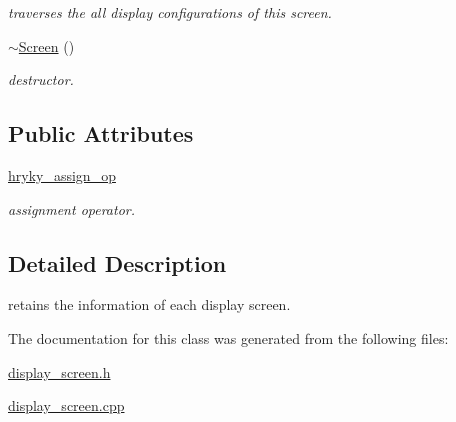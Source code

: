 \begin{DoxyCompactItemize}
\begin{DoxyCompactList}\small\item\em traverses the all display configurations of this screen. \end{DoxyCompactList}\item 
\hypertarget{classhryky_1_1display_1_1_screen_a19350b2102e7212c0a3d15153d5229c4}{\hyperlink{classhryky_1_1display_1_1_screen_a19350b2102e7212c0a3d15153d5229c4}{$\sim$\-Screen} ()}\label{classhryky_1_1display_1_1_screen_a19350b2102e7212c0a3d15153d5229c4}

\begin{DoxyCompactList}\small\item\em destructor. \end{DoxyCompactList}\end{DoxyCompactItemize}
\subsection*{Public Attributes}
\begin{DoxyCompactItemize}
\item 
\hypertarget{classhryky_1_1display_1_1_screen_a3cb32436720c66272e6e270052e6a832}{\hyperlink{classhryky_1_1display_1_1_screen_a3cb32436720c66272e6e270052e6a832}{hryky\-\_\-assign\-\_\-op}}\label{classhryky_1_1display_1_1_screen_a3cb32436720c66272e6e270052e6a832}

\begin{DoxyCompactList}\small\item\em assignment operator. \end{DoxyCompactList}\end{DoxyCompactItemize}


\subsection{Detailed Description}
retains the information of each display screen. 

The documentation for this class was generated from the following files\-:\begin{DoxyCompactItemize}
\item 
\hyperlink{display__screen_8h}{display\-\_\-screen.\-h}\item 
\hyperlink{display__screen_8cpp}{display\-\_\-screen.\-cpp}\end{DoxyCompactItemize}
